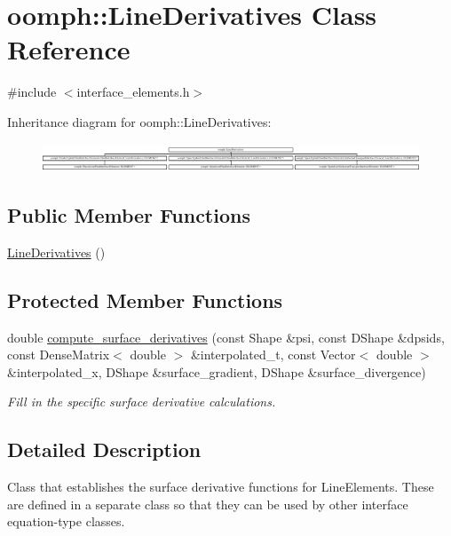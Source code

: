 \hypertarget{classoomph_1_1LineDerivatives}{}\section{oomph\+:\+:Line\+Derivatives Class Reference}
\label{classoomph_1_1LineDerivatives}


{\ttfamily \#include $<$interface\+\_\+elements.\+h$>$}

Inheritance diagram for oomph\+:\+:Line\+Derivatives\+:\begin{figure}[H]
\begin{center}
\leavevmode
\includegraphics[height=0.861539cm]{classoomph_1_1LineDerivatives}
\end{center}
\end{figure}
\subsection*{Public Member Functions}
\begin{DoxyCompactItemize}
\item 
\hyperlink{classoomph_1_1LineDerivatives_ab8e7af32651605a82d53995caddbe7fb}{Line\+Derivatives} ()
\end{DoxyCompactItemize}
\subsection*{Protected Member Functions}
\begin{DoxyCompactItemize}
\item 
double \hyperlink{classoomph_1_1LineDerivatives_aa50209ce504b25d255f9f0a6df36c0e3}{compute\+\_\+surface\+\_\+derivatives} (const Shape \&psi, const D\+Shape \&dpsids, const Dense\+Matrix$<$ double $>$ \&interpolated\+\_\+t, const Vector$<$ double $>$ \&interpolated\+\_\+x, D\+Shape \&surface\+\_\+gradient, D\+Shape \&surface\+\_\+divergence)
\begin{DoxyCompactList}\small\item\em Fill in the specific surface derivative calculations. \end{DoxyCompactList}\end{DoxyCompactItemize}


\subsection{Detailed Description}
Class that establishes the surface derivative functions for Line\+Elements. These are defined in a separate class so that they can be used by other interface equation-\/type classes. 

